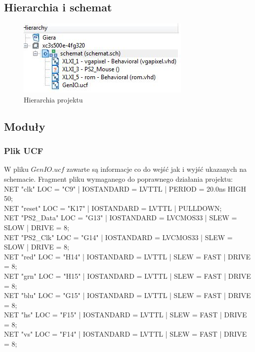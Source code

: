 \documentclass[a4paper]{article}
\begin{document}
\subsection{Hierarchia i schemat}

\begin{figure}[h]
  \caption{Hierarchia projektu}
  \includegraphics[scale=1.0]{hierarchia}
  \centering
\end{figure}
\subsection{Moduły}

\subsubsection{Plik UCF}

W pliku $GenIO.ucf$ zawarte są informacje co do wejść jak i wyjść ukazanych na schemacie. Fragment pliku wymaganego do poprawnego działania projektu:\\

NET "clk" LOC = "C9" | IOSTANDARD = LVTTL | PERIOD = 20.0ns HIGH 50;\\
NET "reset" LOC = "K17" | IOSTANDARD = LVTTL | PULLDOWN;\\
NET "PS2\_Data" LOC = "G13" | IOSTANDARD = LVCMOS33 | SLEW = SLOW | DRIVE = 8;\\
NET "PS2\_Clk"  LOC = "G14" | IOSTANDARD = LVCMOS33 | SLEW = SLOW | DRIVE = 8;\\
NET "red"  LOC = "H14" | IOSTANDARD = LVTTL | SLEW = FAST | DRIVE = 8;\\
NET "grn"  LOC = "H15" | IOSTANDARD = LVTTL | SLEW = FAST | DRIVE = 8;\\
NET "blu"  LOC = "G15" | IOSTANDARD = LVTTL | SLEW = FAST | DRIVE = 8;\\
NET "hs" LOC = "F15" | IOSTANDARD = LVTTL | SLEW = FAST | DRIVE = 8;\\
NET "vs" LOC = "F14" | IOSTANDARD = LVTTL | SLEW = FAST | DRIVE = 8;\\
\end{document}
